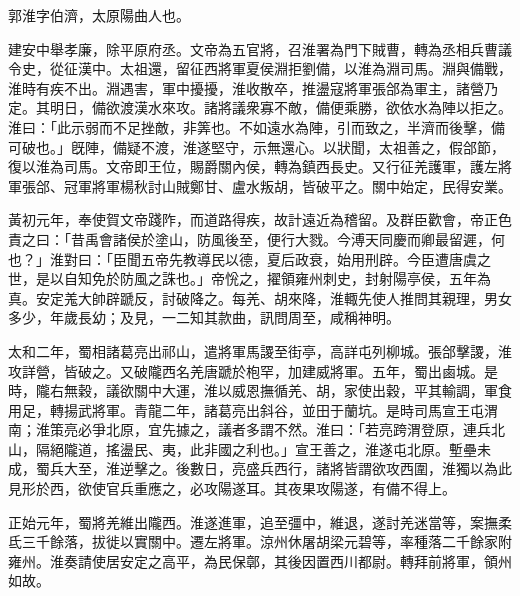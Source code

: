 \begin{pinyinscope}
 
 
 郭淮字伯濟，太原陽曲人也。
 
 
 建安中舉孝廉，除平原府丞。文帝為五官將，召淮署為門下賊曹，轉為丞相兵曹議令史，從征漢中。太祖還，留征西將軍夏侯淵拒劉備，以淮為淵司馬。淵與備戰，淮時有疾不出。淵遇害，軍中擾擾，淮收散卒，推盪寇將軍張郃為軍主，諸營乃定。其明日，備欲渡漢水來攻。諸將議衆寡不敵，備便乘勝，欲依水為陣以拒之。淮曰：「此示弱而不足挫敵，非筭也。不如遠水為陣，引而致之，半濟而後擊，備可破也。」旣陣，備疑不渡，淮遂堅守，示無還心。以狀聞，太祖善之，假郃節，復以淮為司馬。文帝即王位，賜爵關內侯，轉為鎮西長史。又行征羌護軍，護左將軍張郃、冠軍將軍楊秋討山賊鄭甘、盧水叛胡，皆破平之。關中始定，民得安業。
 
 
 
 
 黃初元年，奉使賀文帝踐阼，而道路得疾，故計遠近為稽留。及群臣歡會，帝正色責之曰：「昔禹會諸侯於塗山，防風後至，便行大戮。今溥天同慶而卿最留遲，何也？」淮對曰：「臣聞五帝先教導民以德，夏后政衰，始用刑辟。今臣遭唐虞之世，是以自知免於防風之誅也。」帝恱之，擢領雍州刺史，封射陽亭侯，五年為真。安定羗大帥辟蹏反，討破降之。每羌、胡來降，淮輙先使人推問其親理，男女多少，年歲長幼；及見，一二知其款曲，訊問周至，咸稱神明。
 
 
 
 
 太和二年，蜀相諸葛亮出祁山，遣將軍馬謖至街亭，高詳屯列柳城。張郃擊謖，淮攻詳營，皆破之。又破隴西名羌唐蹏於枹罕，加建威將軍。五年，蜀出鹵城。是時，隴右無穀，議欲關中大運，淮以威恩撫循羌、胡，家使出穀，平其輸調，軍食用足，轉揚武將軍。青龍二年，諸葛亮出斜谷，並田于蘭坑。是時司馬宣王屯渭南；淮策亮必爭北原，宜先據之，議者多謂不然。淮曰：「若亮跨渭登原，連兵北山，隔絕隴道，搖盪民、夷，此非國之利也。」宣王善之，淮遂屯北原。塹壘未成，蜀兵大至，淮逆擊之。後數日，亮盛兵西行，諸將皆謂欲攻西圍，淮獨以為此見形於西，欲使官兵重應之，必攻陽遂耳。其夜果攻陽遂，有備不得上。
 
 
 
 
 正始元年，蜀將羌維出隴西。淮遂進軍，追至彊中，維退，遂討羌迷當等，案撫柔氐三千餘落，拔徙以實關中。遷左將軍。涼州休屠胡梁元碧等，率種落二千餘家附雍州。淮奏請使居安定之高平，為民保鄣，其後因置西川都尉。轉拜前將軍，領州如故。
 
 
 

\end{pinyinscope}
